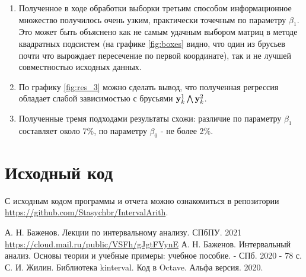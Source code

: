 \documentclass[a4paper]{article}
\begin{document}
\begin{enumerate}
    \item Полученное в ходе обработки выборки третьим способом информационное множество получилось очень узким, практически точечным по параметру $\beta_1$. Это может быть объяснено как не самым удачным выбором матриц в методе квадратных подсистем (на графике \ref{fig:boxes} видно, что один из брусьев почти что вырождает пересечение по первой координате), так и не лучшей совместностью исходных данных.
    \item По графику \ref{fig:res_3} можно сделать вывод, что полученная регрессия обладает слабой зависимостью с брусьями $\mathbf{y}_k^1\bigwedge\mathbf{y}_k^2$.
    \item Полученные тремя подходами результаты схожи: различие по параметру $\beta_1$ составляет около 7\%, по параметру $\beta_0$ - не более 2\%.
\end{enumerate}
\section*{Исходный код}
С исходным кодом программы и отчета можно ознакомиться в репозитории \url{https://github.com/Stasychbr/IntervalArith}.
\begin{thebibliography}{9}
 А. Н. Баженов. Лекции по интервальному анализу. СПбПУ. 2021
 \url{https://cloud.mail.ru/public/VSFh/gJgtFVynE}
 А. Н. Баженов. Интервальный анализ. Основы теории и учебные примеры: учебное пособие. - СПб. 2020 - 78 с.
 С. И. Жилин. Библиотека kinterval. Код в Octave. Альфа версия. 2020.
\end{thebibliography}
\end{document}
